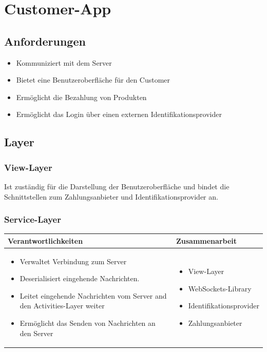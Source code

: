 {\section{Customer-App}

\subsection{Anforderungen}

\begin{itemize}
	\item Kommuniziert mit dem Server
	\item Bietet eine Benutzeroberfläche für den Customer
	\item Ermöglicht die Bezahlung von Produkten
	\item Ermöglicht das Login über einen externen Identifikationsprovider
\end{itemize}

\subsection{Layer}

\subsubsection{View-Layer}
Ist zuständig für die Darstellung der Benutzeroberfläche und bindet die Schnittstellen zum Zahlungsanbieter und Identifikationsprovider an.

\subsubsection{Service-Layer}
\begin{tabular}{|p{}|p{}|} \hline
	\textbf{Verantwortlichkeiten} & \textbf{Zusammenarbeit} \\ \hline \hline
	
	\begin{itemize}
		\item Verwaltet Verbindung zum Server
		\item Deserialisiert eingehende Nachrichten.
		\item Leitet eingehende Nachrichten vom Server and den Activities-Layer weiter
		\item Ermöglicht das Senden von Nachrichten an den Server
	\end{itemize}&
	\begin{itemize}
		\item View-Layer
		\item WebSockets-Library
		\item Identifikationsprovider
		\item Zahlungsanbieter
	\end{itemize}
	\\ \hline
\end{tabular}



}
